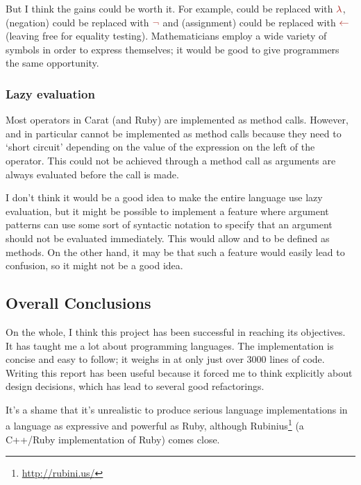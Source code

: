 But I think the gains could be worth it. For example,  could be replaced with $\color{Mahogany} \lambda$, \code{!} (negation) could be replaced with $\color{Mahogany} \neg$ and \code{=} (assignment) could be replaced with $\color{Mahogany} \leftarrow$ (leaving \code{=} free for equality testing). Mathematicians employ a wide variety of symbols in order to express themselves; it would be good to give programmers the same opportunity.

\subsubsection{Lazy evaluation}

Most operators in Carat (and Ruby) are implemented as method calls. However, \code{&&} and \code{||} in particular cannot be implemented as method calls because they need to `short circuit' depending on the value of the expression on the left of the operator. This could not be achieved through a method call as arguments are always evaluated before the call is made.

I don't think it would be a good idea to make the entire language use lazy evaluation, but it might be possible to implement a feature where argument patterns can use some sort of syntactic notation to specify that an argument should not be evaluated immediately. This would allow \code{&&} and \code{||} to be defined as methods. On the other hand, it may be that such a feature would easily lead to confusion, so it might not be a good idea.

\subsection{Overall Conclusions}

On the whole, I think this project has been successful in reaching its objectives. It has taught me a lot about programming languages. The implementation is concise and easy to follow; it weighs in at only just over 3000 lines of code. Writing this report has been useful because it forced me to think explicitly about design decisions, which has lead to several good refactorings.

It's a shame that it's unrealistic to produce serious language implementations in a language as expressive and powerful as Ruby, although Rubinius\footnote{\url{http://rubini.us/}} (a C++/Ruby implementation of Ruby) comes close.

